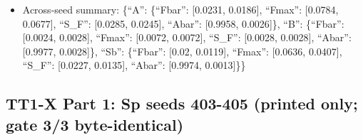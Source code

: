 \documentclass[10pt,twocolumn,letterpaper]{article}
\providecommand{\tightlist}{\setlength{\itemsep}{0pt}\setlength{\parskip}{0pt}}
\begin{document}
\begin{itemize}
  \begin{itemize}
  \tightlist
  \item
    B-A: not distinguished on seeds 403-407 \textbar{} mean -0.021 SD 0.016 negative 5/5 \textbar{} s403: -0.005 {[}-0.006, -0.005{]}; s404: -0.041 {[}-0.045, -0.037{]}; s405: -0.032 {[}-0.040, -0.026{]}; s406: -0.003 {[}-0.006, -0.002{]}; s407: -0.022 {[}-0.028, -0.018{]}
  \item
    Sb-A: not distinguished on seeds 403-407 \textbar{} mean -0.003 SD 0.013 negative 3/5 \textbar{} s403: 0.008 {[}0.005, 0.010{]}; s404: -0.007 {[}-0.012, -0.002{]}; s405: -0.021 {[}-0.028, -0.015{]}; s406: 0.010 {[}0.007, 0.013{]}; s407: -0.005 {[}-0.012, -0.000{]}
  \item
    Sb-B: not distinguished on seeds 403-407 \textbar{} mean 0.018 SD 0.009 negative 0/5 \textbar{} s403: 0.013 {[}0.011, 0.016{]}; s404: 0.034 {[}0.029, 0.039{]}; s405: 0.011 {[}0.008, 0.014{]}; s406: 0.014 {[}0.012, 0.016{]}; s407: 0.017 {[}0.014, 0.019{]}
  \item
    B-Sb: not distinguished on seeds 403-407 \textbar{} mean -0.018 SD 0.009 negative 5/5 \textbar{} s403: -0.013 {[}-0.016, -0.011{]}; s404: -0.034 {[}-0.039, -0.029{]}; s405: -0.011 {[}-0.014, -0.008{]}; s406: -0.014 {[}-0.016, -0.012{]}; s407: -0.017 {[}-0.019, -0.014{]}
  \end{itemize}
\item
  Across-seed summary: \{``A'': \{``Fbar'': {[}0.0231, 0.0186{]}, ``Fmax'': {[}0.0784, 0.0677{]}, ``S\_F'': {[}0.0285, 0.0245{]}, ``Abar'': {[}0.9958, 0.0026{]}\}, ``B'': \{``Fbar'': {[}0.0024, 0.0028{]}, ``Fmax'': {[}0.0072, 0.0072{]}, ``S\_F'': {[}0.0028, 0.0028{]}, ``Abar'': {[}0.9977, 0.0028{]}\}, ``Sb'': \{``Fbar'': {[}0.02, 0.0119{]}, ``Fmax'': {[}0.0636, 0.0407{]}, ``S\_F'': {[}0.0227, 0.0135{]}, ``Abar'': {[}0.9974, 0.0013{]}\}\}
\end{itemize}

\subsection{TT1-X Part 1: Sp seeds 403-405 (printed only; gate 3/3 byte-identical)}\label{tt1-x-part-1-sp-seeds-403-405-printed-only-gate-33-byte-identical}
\end{document}
